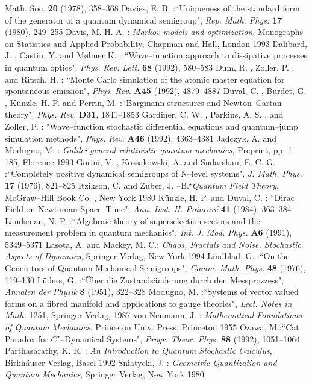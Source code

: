 \documentclass[12pt]{article}
\begin{document}
\begin{thebibliography}{99}
{Math.  Soc. }  {\bf 20} (1978), 358--368
 Davies,  E. B. :``Uniqueness of the standard form of
the generator of a quantum dynamical semigroup", {\sl
Rep. Math. Phys. }{\bf 17} (1980), 249--255
 Davis,  M. H. A. : {\sl Markov models and optimization}, 
Monographs on Statistics and Applied Probability,  Chapman and Hall,  London 1993 
 Dalibard,  J. ,  Castin,  Y.  and M{\o}lmer K. : 
``Wave--function approach to dissipative processes in quantum optics", 
{\sl Phys. Rev. Lett. }{\bf
68} (1992), 580--583
 Dum,  R. ,  Zoller,  P. ,  and Ritsch,  H. : 
``Monte Carlo simulation of the
atomic master equation for spontaneous emission", 
{\sl Phys. Rev. }{\bf A45} (1992), 4879--4887
 Duval,  C. ,  Burdet,  G. ,  K\"unzle,  H. P.  and Perrin, 
M. :``Bargmann structures and Newton--Cartan theory", {\sl Phys. Rev. }{\bf
D31}, 1841--1853 
 Gardiner,  C. W. ,  Parkins,  A. S. ,  and Zoller,  P. : 
"Wave--function stochastic differential equations and 
quantum--jump simulation methods", {\sl Phys. Rev. }{\bf A46} (1992), 4363--4381 
 Jadczyk,  A.  and Modugno,  M. : 
{\sl Galilei general relativistic quantum mechanics}, Preprint, pp. 1--185,  
Florence 1993
 Gorini,  V. ,  Kossakowski,  A.  and Sudarshan, 
E. C. G. :``Completely positive dynamical semigroups of N--level
systems",  {\sl J.  Math.  Phys. }{\bf 17} (1976), 821--825
 Itzikson,  C.  and Zuber,  J. --B.``{\sl Quantum Field
Theory},  McGraw--Hill Book Co. ,  New York 1980
K\"{u}nzle,  H. P.  and Duval,  C. : ``Dirac Field on Newtonian
Space--Time",  {\sl Ann.  Inst.  H.  Poincar\'{e} }{\bf 41}
 (1984), 363--384
 Landsman,  N. P. :``Algebraic theory of
superselection sectors and the measurement problem in quantum
mechanics", {\sl Int. J. Mod. Phys. }{\bf A6} (1991), 5349--5371 
 Lasota, A. and Mackey, M. C.: {\sl Chaos,
Fractals and Noise. Stochastic Aspects of Dynamics}, Springer Verlag,
New York 1994
 Lindblad,  G. :``On the Generators of Quantum Mechanical
Semigroups", {\sl Comm. Math. Phys. }{\bf 48} (1976), 119--130
 L\"uders,  G. :``\"Uber die Zustands\"anderung durch den
Messprozzess", {\sl Annalen der Physik }{\bf 8} (1951), 322--328
 Modugno,  M. :``Systems of vector valued forms on
a fibred manifold and applications to gauge theories", 
{\sl Lect.  Notes in Math. } 1251,  Springer Verlag,  1987
 von Neumann,  J. : {\sl Mathematical Foundations of
Quantum Mechanics},  Princeton Univ.  Press,  Princeton 1955
 Ozawa, M.:``Cat Paradox for $C^{\star}$--Dynamical
Systems", {\sl Progr. Theor. Phys. }{\bf 88} (1992), 1051--1064
  Parthasarathy,  K. R. : {\sl An
Introduction to Quantum Stochastic Calculus},  Birkh\"auser Verlag, 
Basel 1992 
 Sniatycki,  J. : {\sl Geometric Quantization and Quantum
Mechanics},  Springer Verlag,  New York 1980

\end{thebibliography}
\end{document}
